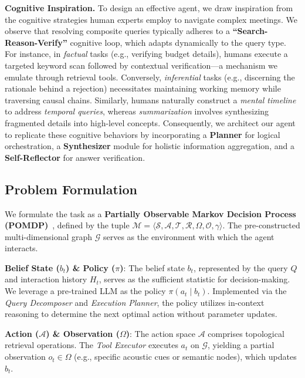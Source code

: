 \documentclass[11pt]{article}
\begin{document}
\textbf{Cognitive Inspiration.}
To design an effective agent, we draw inspiration from the cognitive strategies human experts employ to navigate complex meetings. We observe that resolving composite queries typically adheres to a \textbf{``Search-Reason-Verify''} cognitive loop, which adapts dynamically to the query type. For instance, in \textit{factual} tasks (e.g., verifying budget details), humans execute a targeted keyword scan followed by contextual verification—a mechanism we emulate through retrieval tools. Conversely, \textit{inferential} tasks (e.g., discerning the rationale behind a rejection) necessitates maintaining working memory while traversing causal chains. Similarly, humans naturally construct a \textit{mental timeline} to address \textit{temporal queries}, whereas \textit{summarization} involves synthesizing fragmented details into high-level concepts. Consequently, we architect our agent to replicate these cognitive behaviors by incorporating a \textbf{Planner} for logical orchestration, a \textbf{Synthesizer} module for holistic information aggregation, and a \textbf{Self-Reflector} for answer verification.


\subsection{Problem Formulation}
\label{sec:pomdp_formulation}

We formulate the task as a \textbf{Partially Observable Markov Decision Process (POMDP)}~\cite{POMDPs}, defined by the tuple $\mathcal{M} = \langle \mathcal{S}, \mathcal{A}, \mathcal{T}, \mathcal{R}, \Omega, \mathcal{O}, \gamma \rangle$. The pre-constructed multi-dimensional graph $\mathcal{G}$ serves as the environment with which the agent interacts.  

\textbf{Belief State ($b_t$) \& Policy ($\pi$)}: The belief state $b_t$, represented by the query $Q$ and interaction history $H_t$, serves as the sufficient statistic for decision-making. We leverage a pre-trained LLM as the policy $\pi(a_t \mid b_t)$. Implemented via the \textit{Query Decomposer} and \textit{Execution Planner}, the policy utilizes in-context reasoning to determine the next optimal action without parameter updates.

\textbf{Action ($\mathcal{A}$) \& Observation ($\Omega$)}: The action space $\mathcal{A}$ comprises topological retrieval operations. The \textit{Tool Executor} executes $a_t$ on $\mathcal{G}$, yielding a partial observation $o_t \in \Omega$ (e.g., specific acoustic cues or semantic nodes), which updates $b_t$.
\end{document}
